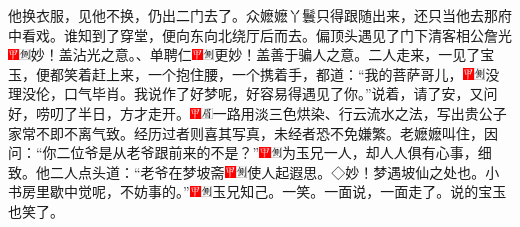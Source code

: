 他换衣服，见他不换，仍出二门去了。众嬷嬷丫鬟只得跟随出来，还只当他去那府中看戏。谁知到了穿堂，便向东向北绕厅后而去。偏顶头遇见了门下清客相公詹光{\includegraphics[width=3mm]{../Images/00002}\includegraphics[width=3mm]{../Images/00011}\footnotesize \kaishu 妙！盖沾光之意。}、单聘仁{\includegraphics[width=3mm]{../Images/00002}\includegraphics[width=3mm]{../Images/00011}\footnotesize \kaishu 更妙！盖善于骗人之意。}二人走来，一见了宝玉，便都笑着赶上来，一个抱住腰，一个携着手，都道：``我的菩萨哥儿，{\includegraphics[width=3mm]{../Images/00002}\includegraphics[width=3mm]{../Images/00011}\footnotesize \kaishu 没理没伦，口气毕肖。}我说作了好梦呢，好容易得遇见了你。''说着，请了安，又问好，唠叨了半日，方才走开。{\includegraphics[width=3mm]{../Images/00002}\includegraphics[width=3mm]{../Images/00010}\footnotesize \kaishu 一路用淡三色烘染、行云流水之法，写出贵公子家常不即不离气致。经历过者则喜其写真，未经者恐不免嫌繁。}老嬷嬷叫住，因问：``你二位爷是从老爷跟前来的不是？''{\includegraphics[width=3mm]{../Images/00002}\includegraphics[width=3mm]{../Images/00011}\footnotesize \kaishu 为玉兄一人，却人人俱有心事，细致。}他二人点头道：``老爷在梦坡斋{\includegraphics[width=3mm]{../Images/00002}\includegraphics[width=3mm]{../Images/00011}\footnotesize \kaishu 使人起遐思。◇妙！梦遇坡仙之处也。}小书房里歇中觉呢，不妨事的。''{\includegraphics[width=3mm]{../Images/00002}\includegraphics[width=3mm]{../Images/00011}\footnotesize \kaishu 玉兄知己。一笑。}一面说，一面走了。说的宝玉也笑了。

